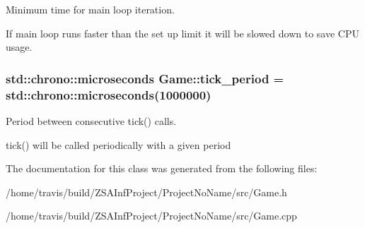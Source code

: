 Minimum time for main loop iteration. 

If main loop runs faster than the set up limit it will be slowed down to save C\-P\-U usage. \hypertarget{classGame_a65800b8c8afee406d719b404a4a78877}{
\subsubsection[{tick\-\_\-period}]{\setlength{\rightskip}{0pt plus 5cm}std\-::chrono\-::microseconds Game\-::tick\-\_\-period = std\-::chrono\-::microseconds(1000000)}}\label{classGame_a65800b8c8afee406d719b404a4a78877}


Period between consecutive tick() calls. 

tick() will be called periodically with a given period 

The documentation for this class was generated from the following files\-:\begin{DoxyCompactItemize}
\item 
/home/travis/build/\-Z\-S\-A\-Inf\-Project/\-Project\-No\-Name/src/Game.\-h\item 
/home/travis/build/\-Z\-S\-A\-Inf\-Project/\-Project\-No\-Name/src/Game.\-cpp\end{DoxyCompactItemize}
